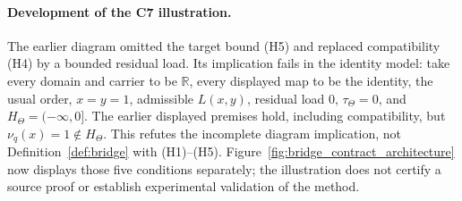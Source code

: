 \documentclass[11pt,a4paper]{article}
\begin{document}
\paragraph{Development of the C7 illustration.}
The earlier diagram omitted the target bound (H5) and replaced compatibility
(H4) by a bounded residual load. Its implication fails in the identity model:
take every domain and carrier to be $\mathbb R$, every displayed map to be the
identity, the usual order, $x=y=1$, admissible $L(x,y)$, residual load $0$,
$\tau_\Theta=0$, and $H_\Theta=(-\infty,0]$. The earlier displayed premises
hold, including compatibility, but $\nu_q(x)=1\notin H_\Theta$. This refutes
the incomplete diagram implication, not Definition~\ref{def:bridge} with
(H1)--(H5). Figure~\ref{fig:bridge_contract_architecture} now displays those
five conditions separately; the illustration does not certify a source proof
or establish experimental validation of the method.
\end{document}
